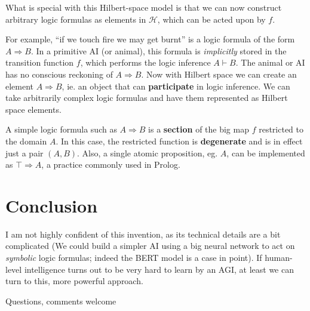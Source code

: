 What is special with this Hilbert-space model is that we can now construct arbitrary logic formulas as elements in $\mathcal{H}$, which can be acted upon by $f$.

For example, ``if we touch fire we may get burnt'' is a logic formula of the form $A \Rightarrow B$.  In a primitive AI (or animal), this formula is \textit{implicitly} stored in the transition function $f$, which performs the logic inference $A \vdash B$.  The animal or AI has no conscious reckoning of $A \Rightarrow B$.  Now with Hilbert space we can create an element $A \Rightarrow B$, ie. an object that can \textbf{participate} in logic inference.  We can take arbitrarily complex logic formulas and have them represented as Hilbert space elements.

A simple logic formula such as $A \Rightarrow B$ is a \textbf{section} of the big map $f$ restricted to the domain $A$.  In this case, the restricted function is \textbf{degenerate} and is in effect just a pair $(A, B)$.  Also, a single atomic proposition, eg. $A$, can be implemented as $\top \Rightarrow A$, a practice commonly used in Prolog.

\section{Conclusion}

I am not highly confident of this invention, as its technical details are a bit complicated (We could build a simpler AI using a big neural network to act on \textit{symbolic} logic formulas; indeed the BERT model is a case in point).  If human-level intelligence turns out to be very hard to learn by an AGI, at least we can turn to this, more powerful approach.

Questions, comments welcome \smiley

